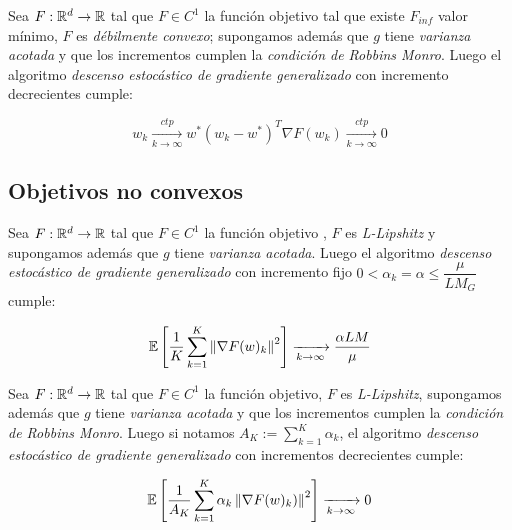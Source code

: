 \begin{theorem}
	Sea $F: {\mathbb{R}}^d \rightarrow {\mathbb{R}}$ tal que $F \in C^1$ la funci\'on objetivo tal que existe $F_{inf}$ valor m\'inimo, $F$ es \textit{d\'ebilmente convexo}; supongamos adem\'as que $g$ tiene \textit{varianza acotada} y que los incrementos cumplen la \textit{condici\'on de Robbins Monro}. Luego el algoritmo \textit{descenso estoc\'astico de gradiente generalizado} con incremento decrecientes cumple:
	
	\begin{subequations}
		\begin{equation*}
		w_k \xrightarrow[k \rightarrow \infty]{ctp} w^*
		\end{equation*}
		\begin{equation*}
		\left(w_k - w^*\right)^T \nabla F(w_k) \xrightarrow[k \rightarrow \infty]{ctp}  0
		\end{equation*}
	\end{subequations}
	
\end{theorem}

\subsection{Objetivos no convexos}

\begin{theorem}
	Sea $F: {\mathbb{R}}^d \rightarrow {\mathbb{R}}$ tal que $F \in C^1$ la funci\'on objetivo , $F$ es \textit{L-Lipshitz} y supongamos adem\'as que $g$ tiene \textit{varianza acotada}. Luego el algoritmo \textit{descenso estoc\'astico de gradiente generalizado} con incremento fijo $0  < \alpha_k = \alpha \leq \dfrac{\mu}{LM_G} $ cumple:
	
	\begin{equation*}
		\mathbb{E} \left[\dfrac{1}{K}\sum\limits_{k=1}^{K} {\left\lVert\nabla F (w)_k\right\rVert^2}\right] \xrightarrow[k \rightarrow \infty]{}  \dfrac{\alpha LM}{\mu}
	\end{equation*}
	
\end{theorem}

\begin{theorem}
	Sea $F: {\mathbb{R}}^d \rightarrow {\mathbb{R}}$ tal que $F \in C^1$ la funci\'on objetivo, $F$ es \textit{L-Lipshitz}, supongamos adem\'as que $g$ tiene \textit{varianza acotada} y que los incrementos cumplen la \textit{condici\'on de Robbins Monro}. Luego si notamos $A_K := \sum\limits_{k=1}^{K} {\alpha_k}$, el algoritmo \textit{descenso estoc\'astico de gradiente generalizado} con incrementos decrecientes cumple:
	
	\begin{equation*}
		\mathbb{E} \left[\dfrac{1}{A_K}\sum\limits_{k=1}^{K} {\alpha_k \left\lVert\nabla F (w)_k)\right\rVert^2}\right] \xrightarrow[k \rightarrow \infty]{} 0
	\end{equation*}
	
\end{theorem}

